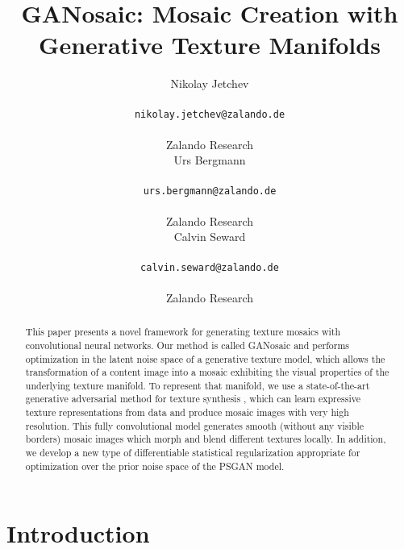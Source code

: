 \documentclass{article}
\title{GANosaic: Mosaic Creation with Generative Texture Manifolds}
\author{
  Nikolay Jetchev\\
  \begin{footnotesize}
  \texttt{nikolay.jetchev@zalando.de} \end{footnotesize}\\
  Zalando Research\\  
  \And Urs Bergmann\\
  \begin{footnotesize}\texttt{urs.bergmann@zalando.de}\end{footnotesize} \\
  Zalando Research\\
  \And Calvin Seward \\
  \begin{footnotesize}
  \texttt{calvin.seward@zalando.de} \end{footnotesize}\\
  Zalando Research\\
}
\begin{document}
\maketitle
\vspace*{-0.5cm}


\begin{abstract}
  This paper presents a novel framework for generating texture mosaics with convolutional neural networks. 
Our method is called GANosaic and performs optimization in the latent noise space of a generative texture model, which allows the transformation of a content image into a mosaic exhibiting the visual properties of the underlying texture manifold. 
To represent that manifold, we use a state-of-the-art generative adversarial method for texture synthesis \cite{PSGAN2017}, which can learn expressive texture representations from data and produce mosaic images with very high resolution. 
This fully convolutional model generates smooth (without any visible borders) mosaic images which morph and blend different textures locally.
In addition, we develop a new type of differentiable statistical regularization appropriate for optimization over the prior noise space of the PSGAN model.


\end{abstract}

\section{Introduction}
\end{document}
